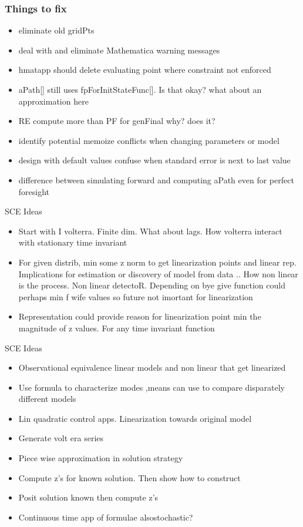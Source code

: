 \documentclass{beamer}
\begin{document}
   \begin{frame}
     \frametitle{Things to fix}
     \begin{itemize}
       \item eliminate old gridPts
     \item deal with and eliminate Mathematica warning messages
       \item hmatapp should delete evaluating point where constraint not enforced
     \item aPath[] still uses fpForInitStateFunc[].  Is that okay? what about an approximation here
     \item  RE compute more than PF for genFinal why? does it?
     \item identify potential memoize conflicts when changing parameters or model
 \item design with default values confuse when standard error is next to last value
 \item difference between simulating forward and computing aPath even for perfect foresight

     \end{itemize}
   \end{frame}
\begin{frame}{SCE Ideas}
\begin{itemize}
	\item Start with I volterra.  Finite dim. What about lags. How volterra interact with stationary time invariant
	\item For given distrib, min  some z norm to get linearization points and linear rep. Implications for estimation or discovery of model from data ..  How non linear is the process.  Non linear detectoR.
	Depending on bye give function could perhaps min f wife values so future not imortant for linearization
	\item Representation could provide reason for linearization point  min the magnitude of z values. For any time invariant function
     \end{itemize}
    \end{frame}
    \begin{frame}{SCE Ideas}
    	\begin{itemize}
    			\item Observational equivalence linear models and non linear that get linearized
	\item Use formula to characterize modes ,means can use to compare disparately different models
	\item Lin quadratic control apps. Linearization towards original model
	\item Generate volt era series
	\item Piece wise approximation in solution strategy
	\item Compute z's for known solution. Then show how to construct
	\item Posit solution known then compute z's
	\item Continuous time app of formulae alsostochastic?
\end{itemize}
\end{frame}
\end{document}
